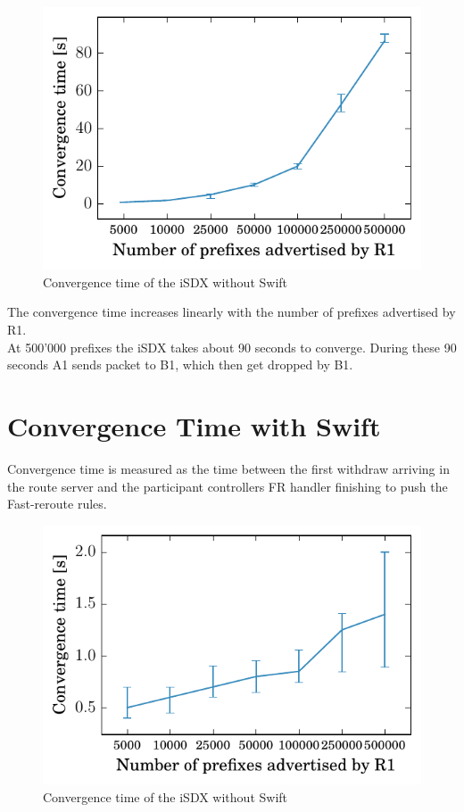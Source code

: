 \begin{figure}[h]
\center
\includegraphics[scale = 1]{Figures/noswift.pdf}
\caption{Convergence time of the iSDX without Swift}
\end{figure}

\newpage

The convergence time increases linearly with the number of prefixes advertised by R1. \\
At 500'000 prefixes the iSDX takes about 90 seconds to converge. During these 90 seconds A1 sends packet to B1, which then get dropped by B1. 

\section{\label{chapter4:Convergence time with Swift}Convergence Time with Swift}

Convergence time is measured as the time between the first withdraw arriving in the route server and the participant controllers FR handler finishing to push the Fast-reroute rules. \\

\begin{figure}[h]
\center
\includegraphics[scale = 1]{Figures/swift.pdf}
\caption{Convergence time of the iSDX without Swift}
\end{figure}

